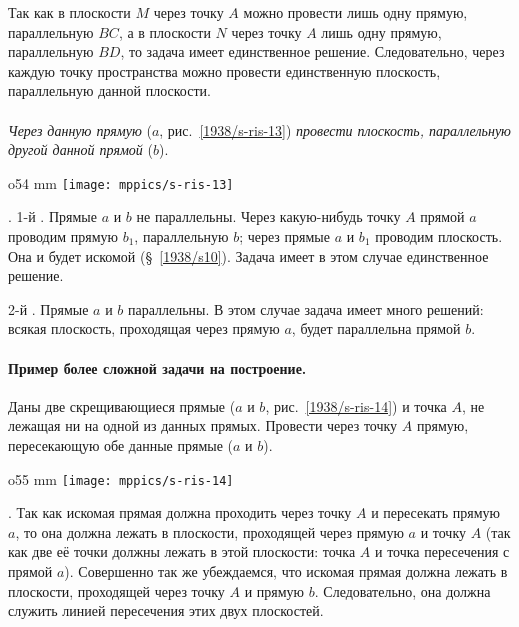 Так как в плоскости $M$ через точку $A$ можно провести лишь одну прямую, параллельную $BC$, а в плоскости $N$ через точку $A$ лишь одну прямую, параллельную $BD$, то задача имеет единственное решение.
Следовательно, через каждую точку пространства можно провести единственную плоскость, параллельную данной плоскости.

\paragraph{}\label{1938/s21}
\emph{Через данную прямую} ($a$, рис.~\ref{1938/s-ris-13}) \emph{провести плоскость, параллельную другой данной прямой} ($b$).

\begin{wrapfigure}{o}{54 mm}
\centering
\texttt{[image: mppics/s-ris-13]}
\caption{}\label{1938/s-ris-13}
\end{wrapfigure}

\mbox{.}
1-й .
Прямые $a$ и $b$ не параллельны.
Через какую-нибудь точку $A$ прямой $a$ проводим прямую $b_1$, параллельную $b$;
через прямые $a$ и $b_1$ проводим плоскость.
Она и будет искомой (§~\ref{1938/s10}).
Задача имеет в этом случае единственное решение.

2-й .
Прямые $a$ и $b$ параллельны.
В этом случае задача имеет много решений: всякая плоскость, проходящая через прямую $a$, будет параллельна прямой $b$.

\paragraph{Пример более сложной задачи на построение.}\label{1938/s22}
Даны две скрещивающиеся прямые ($a$ и $b$, рис.~\ref{1938/s-ris-14}) и точка $A$, не лежащая ни на одной из данных прямых.
Провести через точку $A$ прямую, пересекающую обе данные прямые ($a$ и $b$).

\begin{wrapfigure}{o}{55 mm}
\centering
\texttt{[image: mppics/s-ris-14]}
\caption{}\label{1938/s-ris-14}
\end{wrapfigure}

\mbox{.}
Так как искомая прямая должна проходить через точку $A$ и пересекать прямую $a$, то она должна лежать в плоскости, проходящей через прямую $a$ и точку $A$ (так как две её точки должны лежать в этой плоскости: точка $A$ и точка пересечения с прямой $a$).
Совершенно так же убеждаемся, что искомая прямая должна лежать в плоскости, проходящей через точку $A$ и прямую $b$.
Следовательно, она должна служить линией пересечения этих двух плоскостей.


